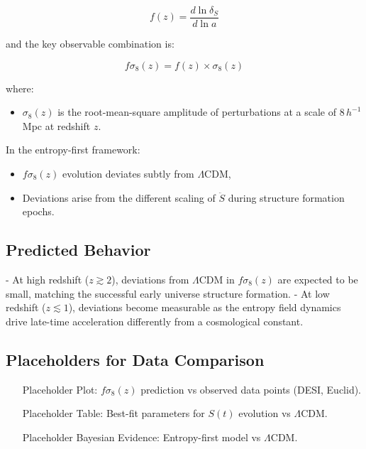\documentclass{article}
\begin{document}
\begin{equation}
f(z) = \frac{d \ln \delta_S}{d \ln a}
\end{equation}

and the key observable combination is:

\begin{equation}
f\sigma_8(z) = f(z) \times \sigma_8(z)
\end{equation}

where:
\begin{itemize}
    \item $\sigma_8(z)$ is the root-mean-square amplitude of perturbations at a scale of $8 \, h^{-1}$ Mpc at redshift $z$.
\end{itemize}

In the entropy-first framework:
\begin{itemize}
    \item $f\sigma_8(z)$ evolution deviates subtly from $\Lambda$CDM,
    \item Deviations arise from the different scaling of $\ddot{S}$ during structure formation epochs.
\end{itemize}

\subsection{Predicted Behavior}

- At high redshift ($z \gtrsim 2$), deviations from $\Lambda$CDM in $f\sigma_8(z)$ are expected to be small, matching the successful early universe structure formation.
- At low redshift ($z \lesssim 1$), deviations become measurable as the entropy field dynamics drive late-time acceleration differently from a cosmological constant.

\subsection{Placeholders for Data Comparison}

\begin{itemize}
    \item [Placeholder] Plot: $f\sigma_8(z)$ prediction vs observed data points (DESI, Euclid).
    \item [Placeholder] Table: Best-fit parameters for $S(t)$ evolution vs $\Lambda$CDM.
    \item [Placeholder] Bayesian Evidence: Entropy-first model vs $\Lambda$CDM.
\end{itemize}
\end{document}
